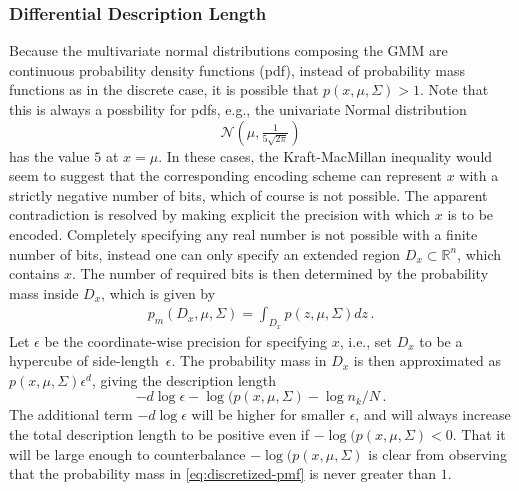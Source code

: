 \documentclass[a4paper,fleqn]{cas-sc}
\theoremstyle{remark}
\begin{document}
\subsubsection{Differential Description Length}
Because the multivariate normal distributions composing the GMM are continuous probability density functions (pdf), instead of probability mass functions as in the discrete case, it is possible that $p(x, \mu, \Sigma) > 1$. 
Note that this is always a possbility for pdfs, e.g., the univariate Normal distribution 
\[
\mathcal{N}(\mu,\tfrac{1}{5\sqrt{2\pi}})
\]
has the value $5$ at $x=\mu$.
In these cases, the Kraft-MacMillan inequality would seem to suggest that the corresponding encoding scheme can represent $x$ with a strictly negative number of bits, which of course is not possible. The apparent contradiction is resolved by making explicit the precision with which $x$ is to be encoded. Completely specifying any real number is not possible with a finite number of bits, instead one can only specify an extended region $D_x \subset \mathbb{R}^n$, which contains $x$. The number of required bits is then determined by the probability mass inside $D_x$, which is given by 
\begin{gather} \label{eq:discretized-pmf}
    p_m(D_x, \mu, \Sigma) = \int_{D_x} p(z, \mu, \Sigma) dz\,.
\end{gather}
Let $\epsilon$ be the coordinate-wise precision for specifying $x$, i.e., set $D_x$ to be a hypercube of side-length~$\epsilon$. The probability mass in $D_x$ is then approximated as $p(x, \mu, \Sigma) \epsilon^{d}$, giving the description length
\begin{equation} \label{eq:pmf-dl}
-d \log \epsilon -\log(p(x, \mu, \Sigma) - \log n_k/N \,.
\end{equation}
The additional term $-d\log{\epsilon}$ will be higher for smaller $\epsilon$, and will always increase the total description length to be positive even if $-\log(p(x, \mu, \Sigma) < 0$. That it will be large enough to counterbalance $-\log(p(x, \mu, \Sigma)$ is clear from observing that the probability mass in \eqref{eq:discretized-pmf} is never greater than $1$. 
\end{document}
